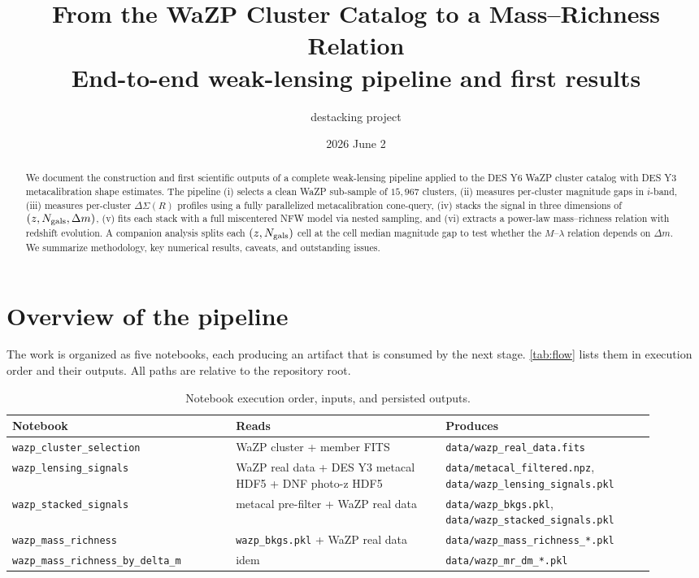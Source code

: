 \documentclass[11pt,a4paper]{article}
\title{\textbf{From the WaZP Cluster Catalog to a Mass--Richness Relation}\\[0.4em]
\large End-to-end weak-lensing pipeline and first results}
\author{destacking project}
\date{2026 June 2}
\newcommand{\DS}{\Delta\Sigma}
\newcommand{\dm}{\Delta m}
\begin{document}
\maketitle

\begin{abstract}
We document the construction and first scientific outputs of a complete
weak-lensing pipeline applied to the DES Y6 WaZP cluster catalog with DES Y3
metacalibration shape estimates. The pipeline (i) selects a clean WaZP
sub-sample of $15{,}967$ clusters, (ii) measures per-cluster magnitude gaps
in $i$-band, (iii) measures per-cluster $\DS(R)$ profiles using a fully
parallelized metacalibration cone-query, (iv) stacks the signal in three
dimensions of $(z, N_{\rm gals}, \dm)$, (v) fits each stack with a full
miscentered NFW model via nested sampling, and (vi) extracts a power-law
mass--richness relation with redshift evolution. A companion analysis splits
each $(z,N_{\rm gals})$ cell at the cell median magnitude gap to test whether
the $M$--$\lambda$ relation depends on $\dm$. We summarize methodology,
key numerical results, caveats, and outstanding issues.
\end{abstract}

\tableofcontents
\bigskip

\section{Overview of the pipeline}

The work is organized as five notebooks, each producing an artifact that is
consumed by the next stage. \autoref{tab:flow} lists them in execution order
and their outputs. All paths are relative to the repository root.

\begin{table}[h]
\centering
\small
\begin{tabular}{p{0.32\linewidth}p{0.30\linewidth}p{0.30\linewidth}}
\toprule
Notebook & Reads & Produces \\
\midrule
\verb|wazp_cluster_selection| & WaZP cluster + member FITS &
\verb|data/wazp_real_data.fits| \\
\verb|wazp_lensing_signals| & WaZP real data + DES Y3 metacal HDF5 + DNF photo-z HDF5 &
\verb|data/metacal_filtered.npz|,
\verb|data/wazp_lensing_signals.pkl| \\
\verb|wazp_stacked_signals| & metacal pre-filter + WaZP real data &
\verb|data/wazp_bkgs.pkl|,
\verb|data/wazp_stacked_signals.pkl| \\
\verb|wazp_mass_richness| & \verb|wazp_bkgs.pkl| + WaZP real data &
\verb|data/wazp_mass_richness_*.pkl| \\
\verb|wazp_mass_richness_by_delta_m| & idem &
\verb|data/wazp_mr_dm_*.pkl| \\
\bottomrule
\end{tabular}
\caption{Notebook execution order, inputs, and persisted outputs.}
\label{tab:flow}
\end{table}
\end{document}
